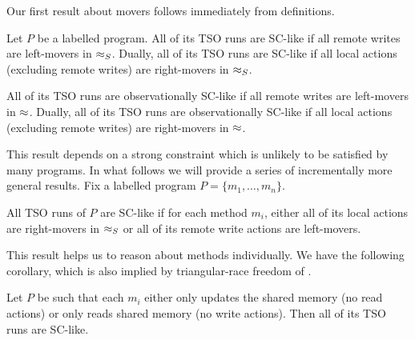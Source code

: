 Our first result about movers follows immediately from definitions.
\begin{lemma}
Let $P$ be a labelled program.
All of its TSO runs are SC-like if all remote writes are left-movers in $\approx_S$.
Dually, all of its TSO runs are SC-like if all local actions (excluding remote writes) are right-movers in $\approx_S$.

All of its TSO runs are observationally SC-like if all remote writes are left-movers in $\approx$.
Dually, all of its TSO runs are observationally SC-like if all local actions (excluding remote writes) are right-movers in $\approx$.
\end{lemma}
This result depends on a strong constraint which is unlikely to be satisfied by many programs.
In what follows we will provide a series of incrementally more general results.
Fix a labelled program $P=\{m_1,\ldots,m_n\}$.
\begin{lemma}
All TSO runs of $P$ are SC-like if for each method $m_i$, either all of its local actions are right-movers in $\approx_S$ or all of its remote write actions are left-movers. 
\end{lemma}
This result helps us to reason about methods individually.
We have the following corollary, which is also implied by triangular-race freedom of \cite{Owe2009}.
\begin{corollary}
Let $P$ be such that each $m_i$ either only updates the shared memory (no read actions) or only reads shared memory (no write actions).
Then all of its TSO runs are SC-like.
\end{corollary}

